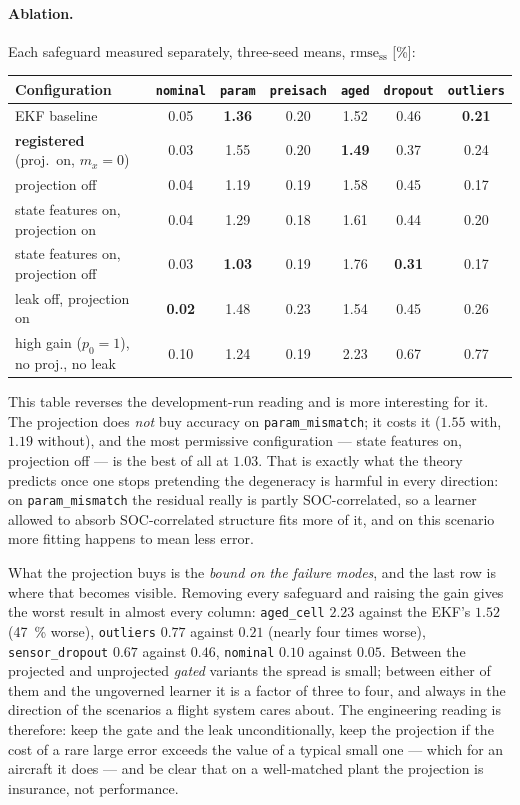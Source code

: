 \paragraph{Ablation.}  Each safeguard measured separately, three-seed means,
$\mathrm{rmse_{ss}}$ [\si{\percent}]:
\begin{center}
\begin{tabular}{@{}lcccccc@{}}
\toprule
Configuration & \texttt{nominal} & \texttt{param} & \texttt{preisach} & \texttt{aged} &
\texttt{dropout} & \texttt{outliers} \\
\midrule
EKF baseline                                   & 0.05 & \textbf{1.36} & 0.20 & 1.52 & 0.46 & \textbf{0.21} \\
\textbf{registered} (proj.\ on, $m_x=0$)       & 0.03 & 1.55 & 0.20 & \textbf{1.49} & 0.37 & 0.24 \\
projection off                                 & 0.04 & 1.19 & 0.19 & 1.58 & 0.45 & 0.17 \\
state features on, projection on               & 0.04 & 1.29 & 0.18 & 1.61 & 0.44 & 0.20 \\
state features on, projection off              & 0.03 & \textbf{1.03} & 0.19 & 1.76 & \textbf{0.31} & 0.17 \\
leak off, projection on                        & \textbf{0.02} & 1.48 & 0.23 & 1.54 & 0.45 & 0.26 \\
high gain ($p_0=1$), no proj., no leak         & 0.10 & 1.24 & 0.19 & 2.23 & 0.67 & 0.77 \\
\bottomrule
\end{tabular}
\end{center}
This table reverses the development-run reading and is more interesting for it.  The projection
does \emph{not} buy accuracy on \texttt{param\_mismatch}; it costs it ($1.55$ with, $1.19$ without),
and the most permissive configuration --- state features on, projection off --- is the best of all
at $1.03$.  That is exactly what the theory predicts once one stops pretending the degeneracy is
harmful in every direction: on \texttt{param\_mismatch} the residual really is partly
SOC-correlated, so a learner allowed to absorb SOC-correlated structure fits more of it, and on
this scenario more fitting happens to mean less error.

What the projection buys is the \emph{bound on the failure modes}, and the last row is where that
becomes visible.  Removing every safeguard and raising the gain gives the worst result in almost
every column: \texttt{aged\_cell} $2.23$ against the EKF's $1.52$ (\SI{47}{\percent} worse),
\texttt{outliers} $0.77$ against $0.21$ (nearly four times worse), \texttt{sensor\_dropout} $0.67$
against $0.46$, \texttt{nominal} $0.10$ against $0.05$.  Between the projected and unprojected
\emph{gated} variants the spread is small; between either of them and the ungoverned learner it is
a factor of three to four, and always in the direction of the scenarios a flight system cares
about.  The engineering reading is therefore: keep the gate and the leak unconditionally, keep the
projection if the cost of a rare large error exceeds the value of a typical small one --- which for
an aircraft it does --- and be clear that on a well-matched plant the projection is insurance, not
performance.

